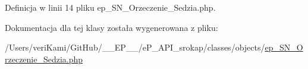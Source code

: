 Definicja w linii 14 pliku ep\-\_\-\-S\-N\-\_\-\-Orzeczenie\-\_\-\-Sedzia.\-php.



Dokumentacja dla tej klasy została wygenerowana z pliku\-:\begin{DoxyCompactItemize}
\item 
/\-Users/veri\-Kami/\-Git\-Hub/\-\_\-\-\_\-\-E\-P\-\_\-\-\_\-/e\-P\-\_\-\-A\-P\-I\-\_\-srokap/classes/objects/\hyperlink{ep___s_n___orzeczenie___sedzia_8php}{ep\-\_\-\-S\-N\-\_\-\-Orzeczenie\-\_\-\-Sedzia.\-php}\end{DoxyCompactItemize}
